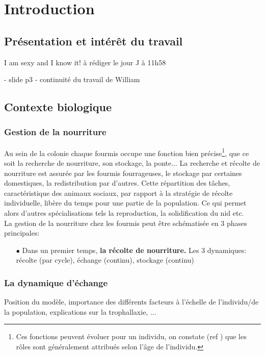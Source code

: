 \chapter{Introduction}

\section{Présentation et intérêt du travail}
I am sexy and I know it! à rédiger le jour J à 11h58

- slide p3
- continuité du travail de William

\section{Contexte biologique}

\subsection{Gestion de la nourriture}

Au sein de la colonie chaque fourmis occupe une fonction bien précise\footnote{Ces fonctions peuvent évoluer pour un individu, on constate (ref \fixme) que les rôles sont généralement attribués selon l'âge de l'individu.}, que ce soit la recherche de nourriture, son stockage, la ponte... La recherche et récolte de nourriture est assurée par les fourmis fourrageuses, le stockage par certaines domestiques, la redistribution par d'autres. Cette répartition des tâches, caractéristique des animaux sociaux, par rapport à la stratégie de récolte individuelle, libère du temps pour une partie de la population. Ce qui permet alors d'autres spécialisations tels la reproduction, la solidification du nid etc.\\


La gestion de la nourriture chez les fourmis peut être schématisée en 3 phases principales:

\begin{itemize}
\item[$\bullet$] Dans un premier temps, \textbf{la récolte de nourriture.}
Les 3 dynamiques: récolte (par cycle), échange (continu), stockage (continu)
\end{itemize}


\subsection{La dynamique d'échange}

Position du modèle, importance des différents facteurs à l'échelle de l'individu/de la population, explications sur la trophallaxie, ...

